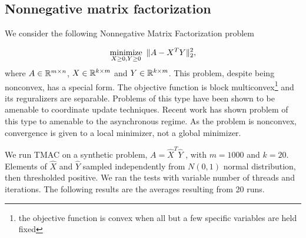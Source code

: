 \subsection{Nonnegative matrix factorization}

We consider the following Nonnegative Matrix Factorization problem

\begin{equation*}
	\operatorname*{minimize}_{X \geq 0,Y \geq 0} ~\|A-X^T Y\|_2^2,
\end{equation*}
where $A \in \mathbb{R}^{m\times n}$, $X \in \mathbb{R}^{k \times m}$ and $Y \in \mathbb{R}^{k \times m}$.
This problem, despite being nonconvex, has a special form.
The objective function is block multiconvex\footnote{the objective function is convex when all but a few specific variables are held fixed} and its reguralizers are separable. Problems of this type have been shown \citep{XuYin2013_block,BolteSabachTeboulle2014_proximal} to be amenable to coordinate update techniques.
Recent work\citep{2016APALM} has shown problem of this type to amenable to the asynchronous regime.
As the problem is nonconvex, convergence is given to a local minimizer, not a global minimizer.

We run TMAC on a synthetic problem, $A=\hat X^T \hat Y$ ,  with $m=1000$ and $k=20$.
Elements of $\hat X$ and $\hat Y$ sampled independently from $N(0, 1)$ normal distribution, then thresholded positive.
We ran the tests with variable number of threads and iterations. 
The following results are the averages resulting from 20 runs.


